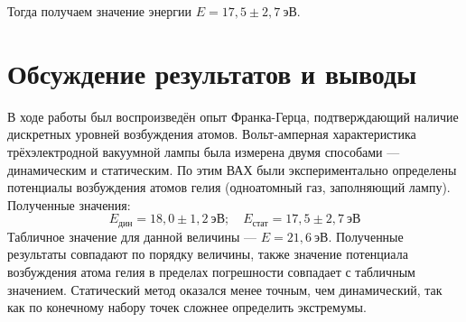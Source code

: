 \documentclass[a4paper, 12pt]{article}
\begin{document}
Тогда получаем значение энергии $E = 17,5\pm2,7~эВ$.

\newpage

\section{Обсуждение результатов и выводы}

В ходе работы был воспроизведён опыт Франка-Герца, подтверждающий наличие дискретных уровней возбуждения атомов. Вольт-амперная характеристика трёхэлектродной вакуумной лампы была измерена двумя способами --- динамическим и статическим. По этим ВАХ были экспериментально определены потенциалы возбуждения атомов гелия (одноатомный газ, заполняющий лампу). Полученные значения:
$$ \boxed{E_{дин} = 18,0\pm1,2~эВ; \quad E_{стат} = 17,5\pm2,7~эВ} $$
Табличное значение для данной величины --- $E = 21,6~эВ$. Полученные результаты совпадают по порядку величины, также значение потенциала возбуждения атома гелия в пределах погрешности совпадает с табличным значением. Статический метод оказался менее точным, чем динамический, так как по конечному набору точек сложнее определить экстремумы.
\end{document}
